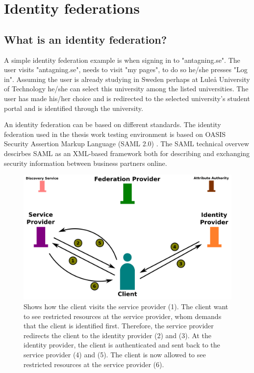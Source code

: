 \section{Identity federations}
\subsection{What is an identity federation?}

A simple identity federation example is when signing in to "antagning.se". 
The user visits "antagning.se", needs to visit "my pages", to do so he/she presses "Log in". 
Assuming the user is already studying in Sweden perhaps at Lule\r{a} University of Technology he/she 
can select this university among the listed universities. 
The user has made his/her choice and is redirected to the selected university's student portal and is identified through the university. 

An identity federation can be based on different standards.
The identity federation used in the thesis work testing environment is based on OASIS Security Assertion Markup Language (SAML 2.0) \cite{pdf:oasis-open-core,pdf:oasis-open-metadata,pdf:oasis-open-metadata-profile,pdf:oasis-open-bindings,pdf:oasis-open-profiles,pdf:oasis-open-glossary,pdf:oasis-open}. 
The SAML technical overvew \cite[p.~8]{pdf:oasis-open} descirbes SAML as an XML-based framework both for
describing and exchanging security information between business partners online.    

\begin{figure}[ht]
\begin{center}
\includegraphics[scale=1]{Figures/identityFed.png}
\end{center}
\caption{Shows how the client visits the service provider (1). 
The client want to see restricted resources at the service provider, whom demands that the client is identified first. 
Therefore, the service provider redirects the client to the identity provider (2) and (3). 
At the identity provider, the client is authenticated and sent back to the service provider (4) and (5). 
The client is now allowed to see restricted resources at the service provider (6).\label{ch3:IdentityFed}}
\end{figure}


